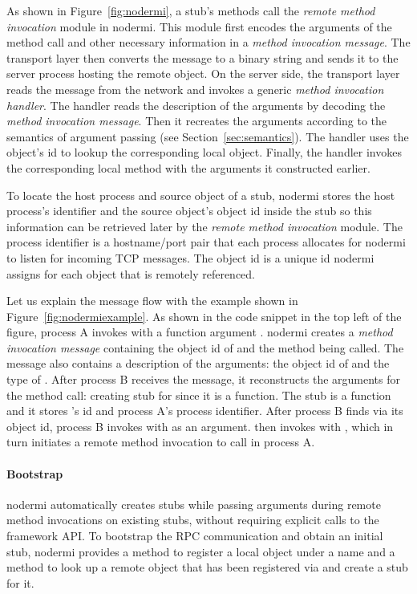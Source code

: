 \nodermifig{}

As shown in Figure~\ref{fig:nodermi}, a stub's methods call the
\emph{remote method invocation} module in nodermi.
This module first encodes the arguments of the method call
 and other necessary information
in a \emph{method invocation message}.
The transport layer then converts the message to
a binary string and sends it
to the server process hosting the remote object.
On the server side, the transport layer reads
the message from the network and invokes a generic
\emph{method invocation handler}.
The handler reads the description of the arguments
by decoding the \emph{method invocation message}.
Then it recreates the arguments according to
the semantics of argument passing (see Section~\ref{sec:semantics}).
The handler uses the object's id to lookup the corresponding local object.
Finally, the handler invokes the corresponding local method
with the arguments it constructed earlier.

To locate the host process and source object of a stub,
nodermi stores the host process's identifier and the source object's object id
inside the stub so this information can be retrieved later by
the \emph{remote method invocation} module.
The process identifier is a hostname/port pair that each process
allocates for nodermi to listen for incoming TCP messages.
The object id is a unique id nodermi assigns for each object that
is remotely referenced.

Let us explain the message flow with the example shown in Figure~\ref{fig:nodermiexample}.
As shown in the code snippet in the top left of the figure,
process A invokes  with a function argument .
nodermi creates a \emph{method invocation message}
containing the object id of  and the method being called.
The message also contains a description of the arguments:
the object id of  and
the type of .
After process B receives the message,
it reconstructs the arguments for the method call:
creating stub  for  since it is a function.
The stub  is a function and
it stores 's id and process A's process identifier.
After process B finds  via its object id,
process B invokes  with  as an argument.
 then invokes  with ,
which in turn initiates a remote method invocation
to call  in process A.


\paragraph{Bootstrap}
nodermi automatically creates stubs while passing arguments during remote method invocations
on existing stubs, without requiring explicit calls to the framework API.
To bootstrap the RPC communication and obtain an initial stub,
nodermi provides a  method to register a local object
under a name and a  method to look up a remote object that
has been registered via  and create a stub for it.

